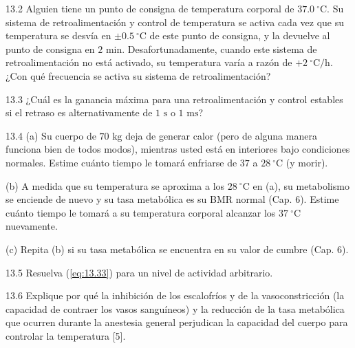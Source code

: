 \documentclass[12pt]{book}
\begin{document}
13.2 Alguien tiene un punto de consigna de temperatura corporal de $37.0\ ^\circ\text{C}$. Su sistema de retroalimentación y control de temperatura se activa cada vez que su temperatura se desvía en $\pm0.5\ ^\circ\text{C}$ de este punto de consigna, y la devuelve al punto de consigna en $2\text{ min}$. Desafortunadamente, cuando este sistema de retroalimentación no está activado, su temperatura varía a razón de $+2\ ^\circ\text{C/h}$. ¿Con qué frecuencia se activa su sistema de retroalimentación?

13.3 ¿Cuál es la ganancia máxima para una retroalimentación y control estables si el retraso es alternativamente de $1\text{ s}$ o $1\text{ ms}$?

13.4 (a) Su cuerpo de $70\text{ kg}$ deja de generar calor (pero de alguna manera funciona bien de todos modos), mientras usted está en interiores bajo condiciones normales. Estime cuánto tiempo le tomará enfriarse de $37$ a $28\ ^\circ\text{C}$ (y morir).

(b) A medida que su temperatura se aproxima a los $28\ ^\circ\text{C}$ en (a), su metabolismo se enciende de nuevo y su tasa metabólica es su BMR normal (Cap. 6). Estime cuánto tiempo le tomará a su temperatura corporal alcanzar los $37\ ^\circ\text{C}$ nuevamente.

(c) Repita (b) si su tasa metabólica se encuentra en su valor de cumbre (Cap. 6).

13.5 Resuelva (\ref{eq:13.33}) para un nivel de actividad arbitrario.

13.6 Explique por qué la inhibición de los escalofríos y de la vasoconstricción (la capacidad de contraer los vasos sanguíneos) y la reducción de la tasa metabólica que ocurren durante la anestesia general perjudican la capacidad del cuerpo para controlar la temperatura [5].
\end{document}
